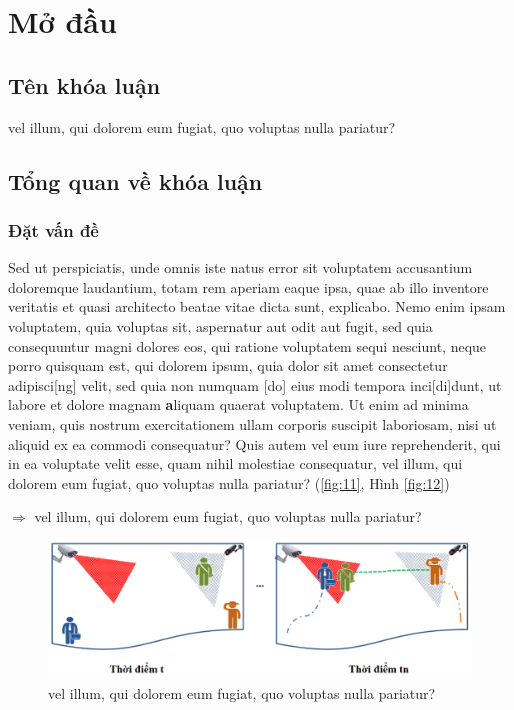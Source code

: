\chapter{Mở đầu}

\section{Tên khóa luận}

vel illum, qui dolorem eum fugiat, quo voluptas nulla pariatur?

\section{Tổng quan về khóa luận}

\subsection{Đặt vấn đề}

Sed ut perspiciatis, unde omnis iste natus error sit voluptatem accusantium doloremque laudantium, totam rem aperiam eaque ipsa, quae ab illo inventore veritatis et quasi architecto beatae vitae dicta sunt, explicabo. Nemo enim ipsam voluptatem, quia voluptas sit, aspernatur aut odit aut fugit, sed quia consequuntur magni dolores eos, qui ratione voluptatem sequi nesciunt, neque porro quisquam est, qui dolorem ipsum, quia dolor sit amet consectetur adipisci[ng] velit, sed quia non numquam [do] eius modi tempora inci[di]dunt, ut labore et dolore magnam {\textbf aliquam quaerat voluptatem}. Ut enim ad minima veniam, quis nostrum exercitationem ullam corporis suscipit laboriosam, nisi ut aliquid ex ea commodi consequatur? Quis autem vel eum iure reprehenderit, qui in ea voluptate velit esse, quam nihil molestiae consequatur, vel illum, qui dolorem eum fugiat, quo voluptas nulla pariatur? (\autoref{fig:11}, Hình \ref{fig:12})

$\Rightarrow$ vel illum, qui dolorem eum fugiat, quo voluptas nulla pariatur?

\begin{figure}
  \includegraphics[width=\linewidth]{Chapter1/Figure/1.png}
  \caption{vel illum, qui dolorem eum fugiat, quo voluptas nulla pariatur?}
  \label{fig:11}
\end{figure}

